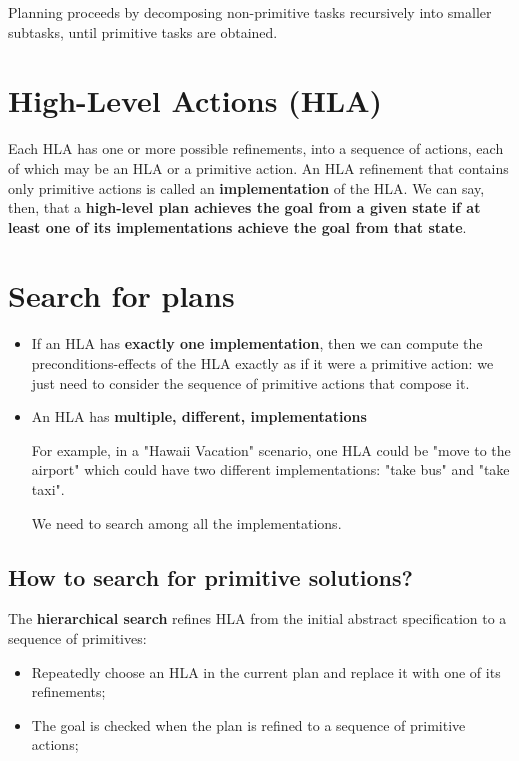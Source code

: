 \documentclass{article}
\begin{document}
Planning proceeds by decomposing non-primitive tasks recursively into smaller subtasks, until primitive tasks are obtained.

\section{High-Level Actions (HLA)}

Each HLA has one or more possible refinements, into a sequence of actions, each of which may be an HLA or a primitive action. An HLA refinement that contains only primitive actions is called an \textbf{implementation} of the
HLA. We can say, then, that a \textbf{high-level plan achieves the goal from a given state if at least
one of its implementations achieve the goal from that state}.

\section{Search for plans}

\begin{itemize}
    \item If an HLA has \textbf{exactly one implementation}, then we can compute the preconditions-effects of the HLA exactly as if it were a primitive action: we just need to consider the sequence of primitive actions that compose it. 
    
    \item An HLA has \textbf{multiple, different, implementations}
    
    For example, in a "Hawaii Vacation" scenario, one HLA could be "move to the airport" which could have two different implementations: "take bus" and "take taxi". 
    
    We need to search among all the implementations.
\end{itemize}

\newpage

\subsection{How to search for primitive solutions?}

The \textbf{hierarchical search} refines HLA from the initial abstract specification to a sequence of primitives:

\begin{itemize}
    \item Repeatedly choose an HLA in the current plan and replace it with one of its refinements;
    \item The goal is checked when the plan is refined to a sequence of primitive actions;
\end{itemize}
\end{document}
